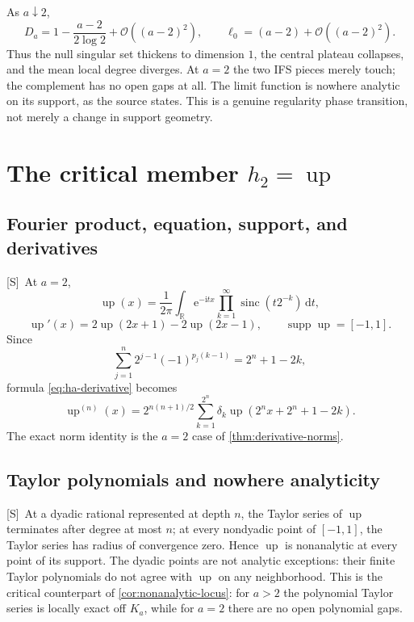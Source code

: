 \documentclass[11pt,oneside]{article}
\theoremstyle{definition}
\theoremstyle{remark}
\newcommand{\R}{\mathbb R}
\newcommand{\Up}{\operatorname{up}}
\newcommand{\sinc}{\operatorname{sinc}}
\newcommand{\e}{\mathrm e}
\newcommand{\ii}{\mathrm i}
\newcommand{\dd}{\,\mathrm d}
\newcommand{\bigO}{\mathcal O}
\newcommand{\supp}{\operatorname{supp}}
\newcommand{\Smark}{\textcolor{sourceblue}{\textsf{[S]}}}
\begin{document}
As $a\downarrow2$,
\begin{equation}
 D_a=1-\frac{a-2}{2\log2}+\bigO((a-2)^2),
 \qquad
 \ell_0=(a-2)+\bigO((a-2)^2).
 \label{eq:critical-expansions}
\end{equation}
Thus the null singular set thickens to dimension $1$, the central plateau collapses, and the
mean local degree diverges.  At $a=2$ the two IFS pieces merely touch; the complement has no
open gaps at all.  The limit function is nowhere analytic on its support, as the source states.
This is a genuine regularity phase transition, not merely a change in support geometry.

\section{The critical member $h_2=\Up$}
\label{sec:up}

\subsection{Fourier product, equation, support, and derivatives}

\Smark\ At $a=2$,
\begin{equation}
 \Up(x)=\frac1{2\pi}\int_{\R}\e^{-\ii tx}
 \prod_{k=1}^{\infty}\sinc(t2^{-k})\dd t,
 \tag{S3.60}
 \label{eq:up-product}
\end{equation}
\begin{equation}
 \Up'(x)=2\Up(2x+1)-2\Up(2x-1),
 \qquad \supp\Up=[-1,1].
 \tag{S3.61--S3.62}
 \label{eq:up-equation}
\end{equation}
Since
\[
 \sum_{j=1}^{n}2^{j-1}(-1)^{p_j(k-1)}=2^n+1-2k,
\]
formula \eqref{eq:ha-derivative} becomes
\begin{equation}
 \Up^{(n)}(x)=2^{n(n+1)/2}
 \sum_{k=1}^{2^n}\delta_k\Up(2^nx+2^n+1-2k).
 \tag{S3.63}
 \label{eq:up-derivative}
\end{equation}
The exact norm identity is the $a=2$ case of \cref{thm:derivative-norms}.

\subsection{Taylor polynomials and nowhere analyticity}

\Smark\ At a dyadic rational represented at depth $n$, the Taylor series of $\Up$
terminates after degree at most $n$; at every nondyadic point of $[-1,1]$, the Taylor series has
radius of convergence zero.
Hence $\Up$ is nonanalytic at every point of its support.  The dyadic points are not analytic
exceptions: their finite Taylor polynomials do not agree with $\Up$ on any neighborhood.
This is the critical counterpart of \cref{cor:nonanalytic-locus}: for $a>2$ the polynomial
Taylor series is locally exact off $K_a$, while for $a=2$ there are no open polynomial gaps.
\end{document}
